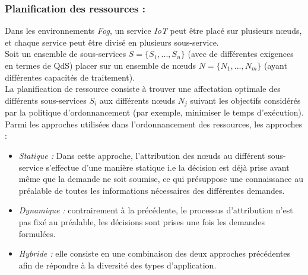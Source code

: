\subsubsection{Planification des ressources :}
Dans les environnements \emph{Fog}, un service \emph{IoT} peut être placé sur plusieurs nœuds, et chaque service peut être divisé en plusieurs sous-service.\\ 
Soit un ensemble de sous-services $S=\{S_{1},...,S_{n}\}$ (avec de différentes exigences en termes de QdS) placer sur un ensemble de nœuds $N=\{N_{1},...,N_{m}\}$ (ayant différentes capacités de traitement).\\
La planification de ressource consiste à trouver une affectation optimale des différents sous-services $S_{i}$ aux différents nœuds $N_{j}$ suivant les objectifs considérés par la politique d'ordonnancement (par exemple, minimiser le temps d'exécution).\\
Parmi les approches utilisées dans l'ordonnancement des ressources, les approches : 
\begin{itemize}
  \item \emph{Statique :} Dans cette approche, l'attribution des nœuds au différent sous-service s'effectue d'une manière statique i.e la décision est déjà prise avant même que la demande ne soit soumise, ce qui présuppose une connaissance au préalable de toutes les informations nécessaires des différentes demandes.
  \item \emph{Dynamique :} contrairement à la précédente, le processus d'attribution  n'est pas fixé au préalable, les décisions sont prises une fois les demandes formulées.
  \item \emph{Hybride :} elle consiste en une combinaison des deux approches précédentes afin de répondre à la diversité des types d'application. 
\end{itemize}
